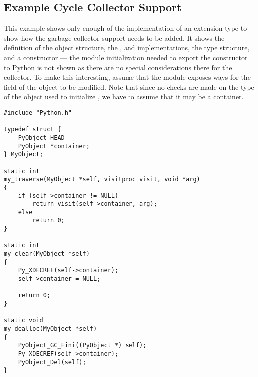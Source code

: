 \documentclass{manual}
\begin{document}
\subsection{Example Cycle Collector Support
            \label{example-cycle-support}}

This example shows only enough of the implementation of an extension
type to show how the garbage collector support needs to be added.  It
shows the definition of the object structure, the
,  and 
implementations, the type structure, and a constructor --- the module
initialization needed to export the constructor to Python is not shown
as there are no special considerations there for the collector.  To
make this interesting, assume that the module exposes ways for the
 field of the object to be modified.  Note that
since no checks are made on the type of the object used to initialize
, we have to assume that it may be a container.

\begin{verbatim}
#include "Python.h"

typedef struct {
    PyObject_HEAD
    PyObject *container;
} MyObject;

static int
my_traverse(MyObject *self, visitproc visit, void *arg)
{
    if (self->container != NULL)
        return visit(self->container, arg);
    else
        return 0;
}

static int
my_clear(MyObject *self)
{
    Py_XDECREF(self->container);
    self->container = NULL;

    return 0;
}

static void
my_dealloc(MyObject *self)
{
    PyObject_GC_Fini((PyObject *) self);
    Py_XDECREF(self->container);
    PyObject_Del(self);
}
\end{verbatim}
\end{document}
